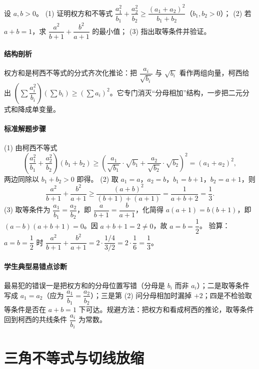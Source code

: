 \begin{problem}
设 $a,b>0$。
(1) 证明权方和不等式
$\dfrac{a_1^2}{b_1}+\dfrac{a_2^2}{b_2}\ge\dfrac{(a_1+a_2)^2}{b_1+b_2}$（$b_1,b_2>0$）；
(2) 若 $a+b=1$，求 $\dfrac{a^2}{b+1}+\dfrac{b^2}{a+1}$ 的最小值；
(3) 指出取等条件并验证。
\end{problem}
\begin{solution}
\paragraph{结构剖析}
权方和是柯西不等式的分式齐次化推论：把 $\dfrac{a_i}{\sqrt{b_i}}$ 与 $\sqrt{b_i}$ 看作两组向量，柯西给出
$\left(\sum\dfrac{a_i^2}{b_i}\right)\left(\sum b_i\right)\ge\left(\sum a_i\right)^2$。它专门消灭“分母相加”结构，一步把二元分式和降成单变量。
\paragraph{标准解题步骤}
(1) 由柯西不等式
$$\left(\frac{a_1^2}{b_1}+\frac{a_2^2}{b_2}\right)(b_1+b_2)
\ge\left(\frac{a_1}{\sqrt{b_1}}\cdot\sqrt{b_1}+\frac{a_2}{\sqrt{b_2}}\cdot\sqrt{b_2}\right)^2=(a_1+a_2)^2,$$
两边同除以 $b_1+b_2>0$ 即得。
(2) 取 $a_1=a$，$a_2=b$，$b_1=b+1$，$b_2=a+1$，则
$$\frac{a^2}{b+1}+\frac{b^2}{a+1}
\ge\frac{(a+b)^2}{(b+1)+(a+1)}=\frac{1}{a+b+2}=\frac13.$$
(3) 取等条件为 $\dfrac{a_1}{b_1}=\dfrac{a_2}{b_2}$，即 $\dfrac{a}{b+1}=\dfrac{b}{a+1}$，化简得 $a(a+1)=b(b+1)$，即 $(a-b)(a+b+1)=0$。因 $a+b+1=2\ne0$，故 $a=b=\dfrac12$。
验算：$a=b=\dfrac12$ 时 $\dfrac{a^2}{b+1}+\dfrac{b^2}{a+1}=2\cdot\dfrac{1/4}{3/2}=2\cdot\dfrac16=\dfrac13$。
\paragraph{学生典型易错点诊断}
最易犯的错误一是把权方和的分母位置写错（分母是 $b_i$ 而非 $a_i$）；二是取等条件写成 $a_1=a_2$（应为 $\dfrac{a_1}{b_1}=\dfrac{a_2}{b_2}$）；三是第 (2) 问分母相加时漏掉 $+2$；四是不检验取等条件是否在 $a+b=1$ 下可达。规避方法：把权方和看成柯西的推论，取等条件回到柯西的共线条件 $\dfrac{a_i}{b_i}$ 为常数。
\end{solution}

\section{三角不等式与切线放缩}


